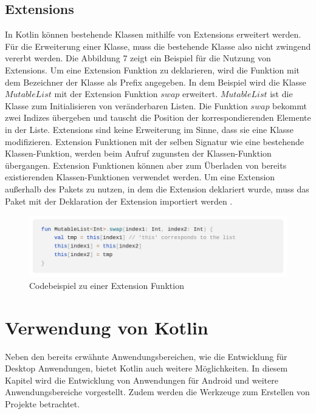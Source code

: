 \documentclass{article}
\begin{document}
\subsection{Extensions}
In Kotlin können bestehende Klassen mithilfe von Extensions erweitert werden. Für die Erweiterung einer Klasse, muss die bestehende Klasse also nicht zwingend vererbt werden. Die Abbildung 7 zeigt ein Beispiel für die Nutzung von Extensions.  Um eine Extension Funktion zu deklarieren, wird die Funktion mit dem Bezeichner der Klasse als Prefix angegeben. In dem Beispiel wird die Klasse $MutableList$ mit der Extension Funktion $swap$ erweitert. $MutableList$ ist die Klasse zum Initialisieren von veränderbaren Listen. Die Funktion $swap$ bekommt zwei Indizes übergeben und tauscht die Position der korrespondierenden Elemente in der Liste. \newline
Extensions sind keine Erweiterung im Sinne, dass sie eine Klasse modifizieren. Extension Funktionen mit der selben Signatur wie eine bestehende Klassen-Funktion, werden beim Aufruf zugunsten der Klassen-Funktion übergangen. Extension Funktionen können aber zum Überladen von bereits existierenden Klassen-Funktionen verwendet werden. Um eine Extension außerhalb des Pakets zu nutzen, in dem die Extension deklariert wurde, muss das Paket mit der Deklaration der Extension importiert werden \cite{KotlinLangDocExtensions}.
\begin{figure}[!htb]
    \centering
    \includegraphics[width=\columnwidth]{img/Extensions.png}
    \caption{Codebeispiel zu einer Extension Funktion\footnotemark}
\end{figure}

\section{Verwendung von Kotlin}
Neben den bereits erwähnte Anwendungsbereichen, wie die Entwicklung für Desktop Anwendungen, bietet Kotlin auch weitere Möglichkeiten. In diesem Kapitel wird die Entwicklung von Anwendungen für Android und weitere Anwendungsbereiche vorgestellt. Zudem werden die Werkzeuge zum Erstellen von Projekte betrachtet.
\end{document}
